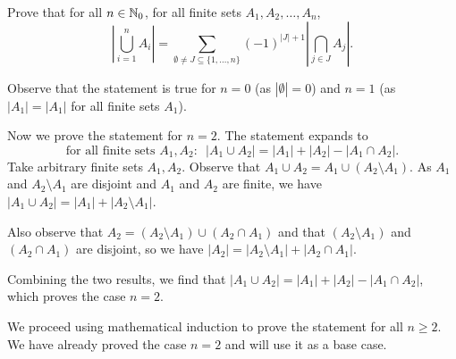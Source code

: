 \question
Prove that for all $n\in\mathbb{N}_0$, for all finite sets $A_1,A_2,\dots,A_n$, \[\left|\bigcup_{i=1}^n A_i\right| = \sum_{\emptyset\neq J\subseteq\{1,\dots,n\}}(-1)^{|J|+1}\left|\bigcap_{j\in J}A_j\right|.\]

\begin{solution}
	Observe that the statement is true for $n=0$ (as $|\emptyset|=0$) and $n=1$ (as $|A_1|=|A_1|$ for all finite sets $A_1$).

	Now we prove the statement for $n=2$. The statement expands to \[\text{for all finite sets $A_1, A_2$:}~~~|A_1\cup A_2|=|A_1|+|A_2|-|A_1\cap A_2|.\]
	Take arbitrary finite sets $A_1, A_2$. Observe that $A_1\cup A_2=A_1\cup(A_2\setminus A_1)$. As $A_1$ and $A_2\setminus A_1$ are disjoint and $A_1$ and $A_2$ are finite, we have $|A_1\cup A_2| = |A_1|+|A_2\setminus A_1|$.

	Also observe that $A_2=(A_2\setminus A_1)\cup(A_2\cap A_1)$ and that $(A_2\setminus A_1)$ and $(A_2\cap A_1)$ are disjoint, so we have $|A_2|=|A_2\setminus A_1|+|A_2\cap A_1|$.

	Combining the two results, we find that $|A_1\cup A_2|=|A_1|+|A_2|-|A_1\cap A_2|$, which proves the case $n=2$.

	\vspace{2mm}
	We proceed using mathematical induction to prove the statement for all $n\geq2$. We have already proved the case $n=2$ and will use it as a base case.


\end{solution}
